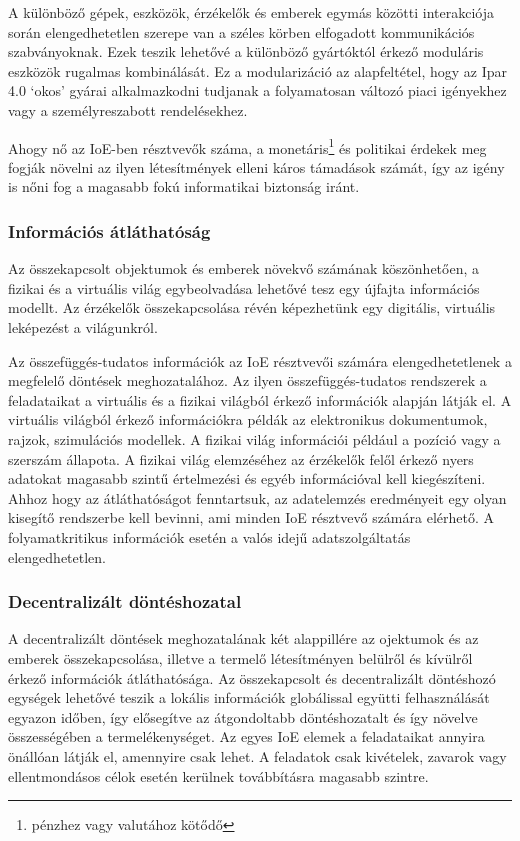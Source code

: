 \documentclass[../documentation.tex]{subfiles}
\begin{document}
A különböző gépek, eszközök, érzékelők és emberek egymás közötti interakciója során elengedhetetlen szerepe van a széles körben elfogadott kommunikációs szabványoknak. Ezek teszik lehetővé a különböző gyártóktól érkező moduláris eszközök rugalmas kombinálását. Ez a modularizáció az alapfeltétel, hogy az Ipar 4.0 `okos' gyárai alkalmazkodni tudjanak a folyamatosan változó piaci igényekhez vagy a személyreszabott rendelésekhez.

Ahogy nő az IoE-ben résztvevők száma, a monetáris\footnote{pénzhez vagy valutához kötődő} és politikai érdekek meg fogják növelni az ilyen létesítmények elleni káros támadások számát, így az igény is nőni fog a magasabb fokú informatikai biztonság iránt.

\subsubsection{Információs átláthatóság}
Az összekapcsolt objektumok és emberek növekvő számának köszönhetően, a fizikai és a virtuális világ egybeolvadása lehetővé tesz egy újfajta információs modellt\cite{newinformation}. Az érzékelők összekapcsolása révén képezhetünk egy digitális, virtuális leképezést a világunkról.

Az összefüggés-tudatos információk az IoE résztvevői számára elengedhetetlenek a megfelelő döntések meghozatalához. Az ilyen összefüggés-tudatos rendszerek a feladataikat a virtuális és a fizikai világból érkező információk alapján látják el. A virtuális világból érkező információkra példák az elektronikus dokumentumok, rajzok, szimulációs modellek. A fizikai világ információi például a pozíció vagy a szerszám állapota. A fizikai világ elemzéséhez az érzékelők felől érkező nyers adatokat magasabb szintű értelmezési és egyéb információval kell kiegészíteni. Ahhoz hogy az átláthatóságot fenntartsuk, az adatelemzés eredményeit egy olyan kisegítő rendszerbe kell bevinni, ami minden IoE résztvevő számára elérhető. A folyamatkritikus információk esetén a valós idejű adatszolgáltatás elengedhetetlen.

\subsubsection{Decentralizált döntéshozatal}
A decentralizált döntések meghozatalának két alappillére az ojektumok és az emberek összekapcsolása, illetve a termelő létesítményen belülről és kívülről érkező információk átláthatósága. Az összekapcsolt és decentralizált döntéshozó egységek lehetővé teszik a lokális információk globálissal együtti felhasználását egyazon időben, így elősegítve az átgondoltabb döntéshozatalt és így növelve összességében a termelékenységet. Az egyes IoE elemek a feladataikat annyira önállóan látják el, amennyire csak lehet. A feladatok csak kivételek, zavarok vagy ellentmondásos célok esetén kerülnek továbbításra magasabb szintre.
\end{document}
